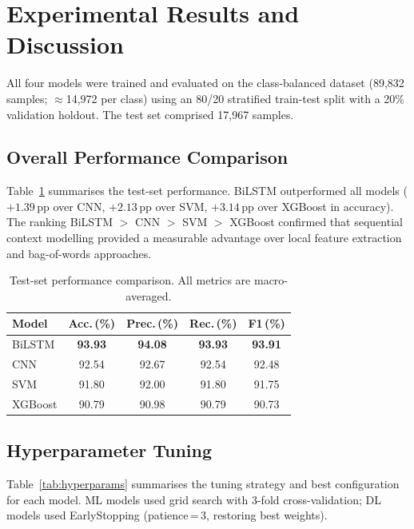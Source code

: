 \section{Experimental Results and Discussion}
\label{sec:results}

All four models were trained and evaluated on the class-balanced dataset (89,832 samples; $\approx$14,972 per class) using an 80/20 stratified train-test split with a 20\% validation holdout. The test set comprised 17,967 samples.

\subsection{Overall Performance Comparison}

Table~\ref{tab:results} summarises the test-set performance. BiLSTM outperformed all models ($+1.39$\,pp over CNN, $+2.13$\,pp over SVM, $+3.14$\,pp over XGBoost in accuracy). The ranking BiLSTM $>$ CNN $>$ SVM $>$ XGBoost confirmed that sequential context modelling provided a measurable advantage over local feature extraction and bag-of-words approaches.

\begin{table}[!htb]
\centering
\caption{Test-set performance comparison. All metrics are macro-averaged.}
\label{tab:results}
\small
\begin{tabular}{@{}lcccc@{}}
\toprule
\textbf{Model} & \textbf{Acc.\,(\%)} & \textbf{Prec.\,(\%)} & \textbf{Rec.\,(\%)} & \textbf{F1\,(\%)} \\
\midrule
BiLSTM   & \textbf{93.93} & \textbf{94.08} & \textbf{93.93} & \textbf{93.91} \\
CNN      & 92.54 & 92.67 & 92.54 & 92.48 \\
SVM      & 91.80 & 92.00 & 91.80 & 91.75 \\
XGBoost  & 90.79 & 90.98 & 90.79 & 90.73 \\
\bottomrule
\end{tabular}
\end{table}

\subsection{Hyperparameter Tuning}

Table~\ref{tab:hyperparams} summarises the tuning strategy and best configuration for each model. ML models used grid search with 3-fold cross-validation; DL models used EarlyStopping (patience\,=\,3, restoring best weights).

